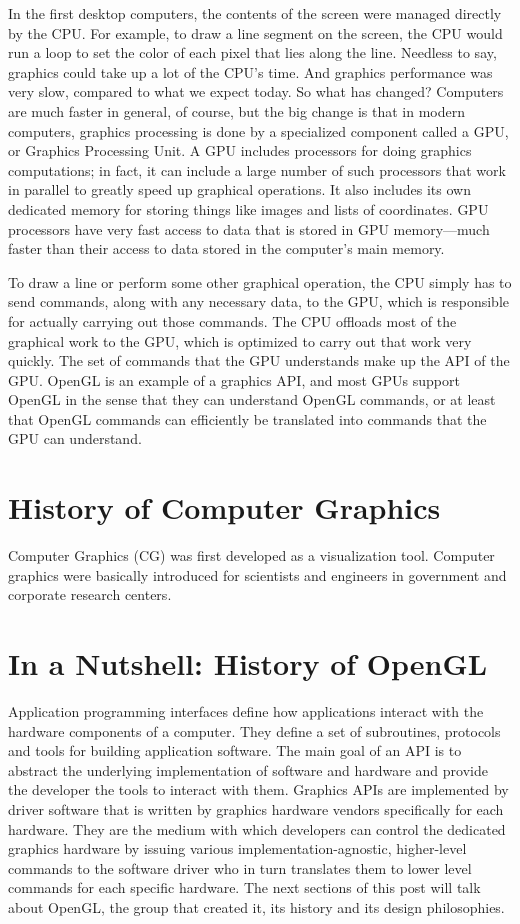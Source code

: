In the first desktop computers, the contents of the screen were managed
directly by the CPU. For example, to draw a line segment on the screen, the CPU
would run a loop to set the color of each pixel that lies along the line.
Needless to say, graphics could take up a lot of the CPU's time. And graphics
performance was very slow, compared to what we expect today. So what has changed?
Computers are much faster in general, of course, but the big change is that in
modern computers, graphics processing is done by a specialized component called
a GPU, or Graphics Processing Unit. A GPU includes processors for doing graphics
computations; in fact, it can include a large number of such processors that work
in parallel to greatly speed up graphical operations. It also includes its own
dedicated memory for storing things like images and lists of coordinates.
GPU processors have very fast access to data that is stored in GPU memory—much
faster than their access to data stored in the computer's main memory.

To draw a line or perform some other graphical operation, the CPU simply
has to send commands, along with any necessary data, to the GPU, which
is responsible for actually carrying out those commands. The CPU offloads most
of the graphical work to the GPU, which is optimized to carry out that work very
quickly. The set of commands that the GPU understands make up the API of the GPU.
OpenGL is an example of a graphics API, and most GPUs support OpenGL in the sense
that they can understand OpenGL commands, or at least that OpenGL commands can
efficiently be translated into commands that the GPU can understand.

\section{History of Computer Graphics}

Computer Graphics (CG) was first developed as a visualization tool.
Computer graphics were basically introduced for scientists and engineers
in government and corporate research centers.

\section{In a Nutshell: History of OpenGL}

Application programming interfaces define how applications interact with
the hardware components of a computer. They define a set of subroutines,
protocols and tools for building application software. The main goal of an
API is to abstract the underlying implementation of software and hardware and
provide the developer the tools to interact with them. Graphics APIs are
implemented by driver software that is written by graphics hardware vendors
specifically for each hardware. They are the medium with which developers can
control the dedicated graphics hardware by issuing various
implementation-agnostic, higher-level commands to the software driver
who in turn translates them to lower level commands for each specific
hardware. The next sections of this post will talk about OpenGL,
the group that created it, its history and its design philosophies.

